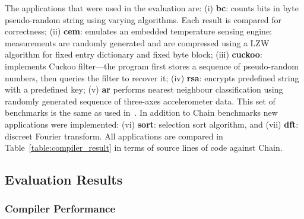 The applications that were used in the evaluation are: (i) \textbf{bc}: counts bits in byte pseudo-random string using varying algorithms. Each result is compared for correctness; (ii) \textbf{cem}: emulates an embedded temperature sensing engine: measurements are randomly generated and are compressed using a LZW algorithm for  fixed entry dictionary and fixed byte block; (iii) \textbf{cuckoo}: implements Cuckoo filter---the program first stores a sequence of pseudo-random numbers, then queries the filter to recover it; (iv) \textbf{rsa}: encrypts predefined string with a predefined key; (v) \textbf{ar} performs nearest neighbour classification using randomly generated sequence of three-axes accelerometer data. This set of benchmarks is the same as used in~\cite{chain,alpaca}. In addition to Chain benchmarks new applications were implemented: (vi) \textbf{sort}: selection sort algorithm, and (vii) \textbf{dft}: discreet Fourier transform. All applications are compared in Table~\ref{table:compiler_result} in terms of source lines of code against Chain.


\subsection{\sys Evaluation Results}
\label{sec:results_evaluation}

\subsubsection{\sys Compiler Performance}
\label{sec:results_compiler}

